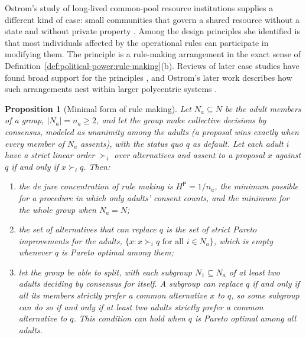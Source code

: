 \documentclass[11pt,letterpaper]{article}
\newtheorem{proposition}[theorem]{Proposition}
\theoremstyle{definition}
\theoremstyle{remark}
\newcommand{\pP}{\mathsf{P}}
\begin{document}
Ostrom's study of long-lived common-pool resource institutions supplies a different kind of case: small communities that govern a shared resource without a state and without private property \citep{ostrom1990}. Among the design principles she identified is that most individuals affected by the operational rules can participate in modifying them. The principle is a rule-making arrangement in the exact sense of Definition~\ref{def:political-power:rule-making}(b). Reviews of later case studies have found broad support for the principles \citep{cox2010}, and Ostrom's later work describes how such arrangements nest within larger polycentric systems \citep{ostromdesign2010}.

\begin{proposition}[Minimal form of rule making]
\label{prop:political-power:minimal-form}
Let $N_a\subseteq N$ be the adult members of a group, $|N_a|=n_a\ge2$, and let the group make collective decisions by consensus, modeled as unanimity among the adults (a proposal wins exactly when every member of $N_a$ assents), with the status quo $q$ as default. Let each adult $i$ have a strict linear order $\succ_i$ over alternatives and assent to a proposal $x$ against $q$ if and only if $x\succ_i q$. Then:
\begin{enumerate}[label=(\alph*)]
\item the de jure concentration of rule making is $H^{\pP}=1/n_a$, the minimum possible for a procedure in which only adults' consent counts, and the minimum for the whole group when $N_a=N$;
\item the set of alternatives that can replace $q$ is the set of strict Pareto improvements for the adults, $\{x: x\succ_i q \text{ for all } i\in N_a\}$, which is empty whenever $q$ is Pareto optimal among them;
\item let the group be able to split, with each subgroup $N_1\subseteq N_a$ of at least two adults deciding by consensus for itself. A subgroup can replace $q$ if and only if all its members strictly prefer a common alternative $x$ to $q$, so some subgroup can do so if and only if at least two adults strictly prefer a common alternative to $q$. This condition can hold when $q$ is Pareto optimal among all adults.
\end{enumerate}
\end{proposition}
\end{document}
